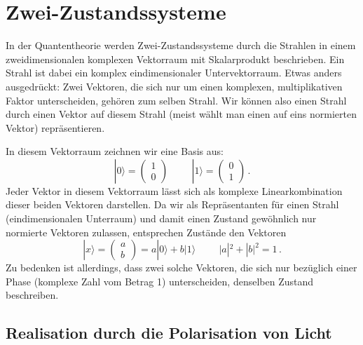     
\section{Zwei-Zustandssysteme}

In der Quantentheorie werden Zwei-Zustandssysteme durch die Strahlen in einem
zweidimensionalen komplexen Vektorraum mit Skalarprodukt beschrieben. Ein Strahl ist dabei ein komplex eindimensionaler
Untervektorraum. Etwas anders ausgedr\"uckt: Zwei Vektoren, die sich nur um einen komplexen, multiplikativen
Faktor unterscheiden, geh\"oren zum selben Strahl. Wir k\"onnen also einen Strahl durch einen Vektor auf diesem
Strahl (meist w\"ahlt man einen auf eins normierten Vektor) repr\"asentieren. 

In diesem Vektorraum zeichnen wir eine Basis aus:
\begin{equation}
\label{eq_QM1_Basis}
           |0\rangle = \left( \!\! \begin{array}{c}  1 \\ 0 \end{array} \!\! \right)  \hspace{1cm}
           |1\rangle = \left(\!\! \begin{array}{c}  0 \\ 1 \end{array}  \!\! \right)  \, .
\end{equation}
Jeder Vektor in diesem Vektorraum l\"asst sich als komplexe Linearkombination dieser beiden Vektoren
darstellen. Da wir als Repr\"asentanten f\"ur einen Strahl (eindimensionalen Unterraum) und damit einen Zustand 
gew\"ohnlich nur normierte Vektoren zulassen, entsprechen Zust\"ande den Vektoren
\begin{equation}
\label{eq_QM1_Einheitsvektor}
           | x \rangle = \left(\!\! \begin{array}{c}  a \\ b \end{array} \!\! \right) = 
            a |0\rangle + b |1 \rangle    \hspace{1cm} |a|^2 + |b|^2 = 1 \, .
\end{equation}
Zu bedenken ist allerdings, dass zwei solche Vektoren, die sich nur bez\"uglich einer
Phase (komplexe Zahl vom Betrag 1) unterscheiden, denselben Zustand beschreiben. 

\subsection{Realisation durch die Polarisation von Licht}

